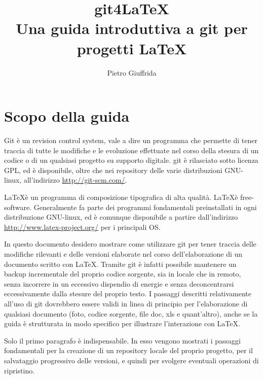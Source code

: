 \documentclass[a4paper,12pt,oneside]{article}
\begin{document}

\title{git4\LaTeX \\
  Una guida introduttiva a git per progetti \LaTeX}
\author{Pietro Giuffrida}
\maketitle
\newpage
\tableofcontents
\newpage
\section{Scopo della guida}
Git è un revision control system, vale a dire un programma che permette di
tener traccia di tutte le modifiche e le evoluzione effettuate nel corso della
stesura di un codice o di un qualsiasi progetto su supporto digitale. git è
rilasciato sotto licenza GPL, ed è disponibile, oltre che nei repository delle
varie distribuzioni GNU-linux, all'indirizzo \url{http://git-scm.com/}.

\LaTeX è un programma di composizione tipografica di alta qualità. \LaTeX è
free-software. Generalmente fa parte dei programmi fondamentali preinstallati in
ogni distribuzione GNU-linux, ed è comunque disponibile a partire dall'indirizzo
\url{http://www.latex-project.org/} per i principali OS.

In questo documento desidero mostrare come utilizzare git per tener traccia
delle modifiche rilevanti e delle versioni elaborate nel corso dell'elaborazione
di un documento scritto con \LaTeX. Tramite git è infatti possibile mantenere un
backup incrementale del proprio codice sorgente, sia in locale che in remoto,
senza incorrere in un eccessivo dispendio di energie e senza deconcentrarsi
eccessivamente dalla stesure del proprio testo. I passaggi descritti
relativamente all'uso di git dovrebbero essere validi in linea di principio per
l'elaborazione di qualsiasi documento (foto, codice sorgente, file doc, xls
e quant'altro), anche se la guida è strutturata in modo specifico per
illustrare l'interazione con \LaTeX.

Solo il primo paragrafo è indispensabile. In esso vengono mostrati i passaggi
fondamentali per la creazione di un repository locale del proprio progetto, per
il salvataggio progressivo delle versioni, e quindi per svolgere eventuali
operazioni di ripristino.
\end{document}
